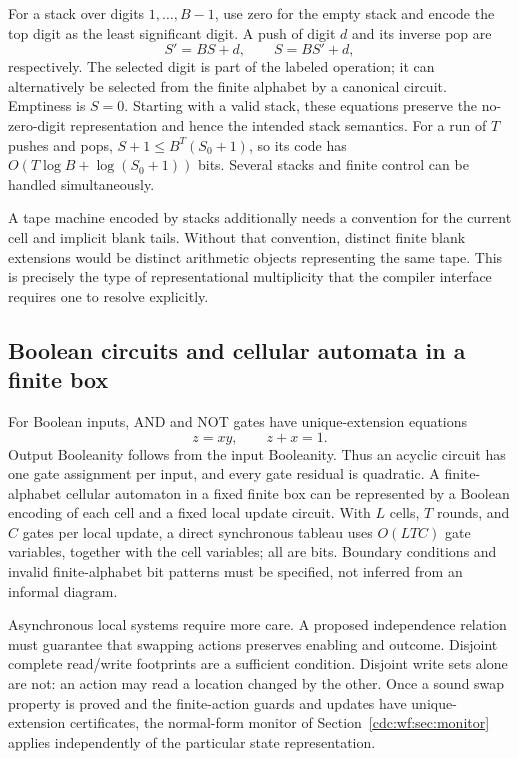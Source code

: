 \documentclass[11pt,a4paper]{article}
\theoremstyle{definition}
\theoremstyle{remark}
\begin{document}
For a stack over digits $1,\ldots,B-1$, use zero for the empty stack and encode the top digit as the least significant digit. A push of digit $d$ and its inverse pop are
\[
 S'=BS+d,\qquad S=BS'+d,
\]
respectively. The selected digit is part of the labeled operation; it can alternatively be selected from the finite alphabet by a canonical circuit. Emptiness is $S=0$. Starting with a valid stack, these equations preserve the no-zero-digit representation and hence the intended stack semantics. For a run of $T$ pushes and pops, $S+1\leq B^T(S_0+1)$, so its code has $O(T\log B+\log(S_0+1))$ bits. Several stacks and finite control can be handled simultaneously.

A tape machine encoded by stacks additionally needs a convention for the current cell and implicit blank tails. Without that convention, distinct finite blank extensions would be distinct arithmetic objects representing the same tape. This is precisely the type of representational multiplicity that the compiler interface requires one to resolve explicitly.

\subsection{Boolean circuits and cellular automata in a finite box}
For Boolean inputs, AND and NOT gates have unique-extension equations
\[
 z=xy,\qquad z+x=1.
\]
Output Booleanity follows from the input Booleanity. Thus an acyclic circuit has one gate assignment per input, and every gate residual is quadratic. A finite-alphabet cellular automaton in a fixed finite box can be represented by a Boolean encoding of each cell and a fixed local update circuit. With $L$ cells, $T$ rounds, and $C$ gates per local update, a direct synchronous tableau uses $O(LTC)$ gate variables, together with the cell variables; all are bits. Boundary conditions and invalid finite-alphabet bit patterns must be specified, not inferred from an informal diagram.

Asynchronous local systems require more care. A proposed independence relation must guarantee that swapping actions preserves enabling and outcome. Disjoint complete read/write footprints are a sufficient condition. Disjoint write sets alone are not: an action may read a location changed by the other. Once a sound swap property is proved and the finite-action guards and updates have unique-extension certificates, the normal-form monitor of Section~\ref{cdc:wf:sec:monitor} applies independently of the particular state representation.
\end{document}
